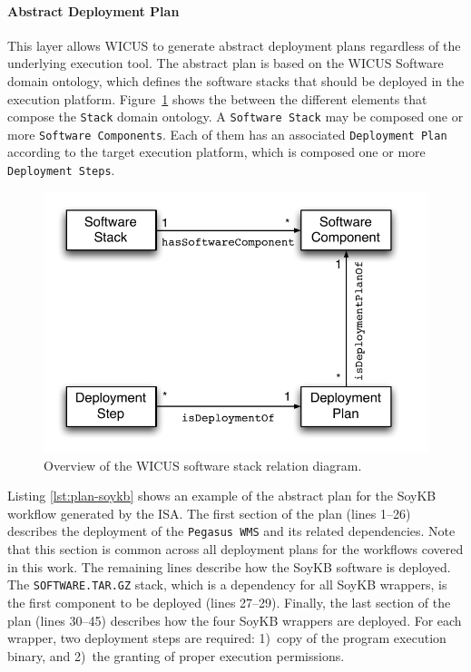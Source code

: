 \paragraph{\textbf{Abstract Deployment Plan}}
This layer allows WICUS to generate abstract deployment plans regardless of the
underlying execution tool. The abstract plan is based on the WICUS Software~\cite{wicus} 
domain ontology, which defines the software stacks that should be deployed in the 
execution platform. Figure~\ref{fig:stack-rel} shows the  between the different
elements that compose the \texttt{Stack} domain ontology. A \texttt{Software Stack} may
be composed  one or more \texttt{Software Components}. Each of them has an associated 
\texttt{Deployment Plan} according to the target execution platform, which is composed  
one or more \texttt{Deployment Steps}.

\begin{figure}[!htb]
	\centering
	\includegraphics[width=0.9\linewidth]{figures/stack-rel}
	\caption{Overview of the WICUS software stack relation diagram.}
	\label{fig:stack-rel}
\end{figure}

Listing \ref{lst:plan-soykb} shows an example of the abstract plan for the SoyKB workflow generated by the ISA. 
The first section of the plan (lines 1--26) describes the deployment of the \texttt{Pegasus 
WMS} and its related dependencies. Note that this section is common across all deployment
plans for the workflows covered in this work. The remaining lines describe how the SoyKB 
software is deployed. The \texttt{SOFTWARE.TAR.GZ} stack, which is a dependency for all 
SoyKB wrappers, is the first component to be deployed (lines 27--29). Finally, the last section 
of the plan (lines 30--45) describes how the four SoyKB wrappers are deployed. For each
wrapper, two deployment steps are required: 1)~copy of the program execution binary, and
2)~the granting of proper execution permissions.

